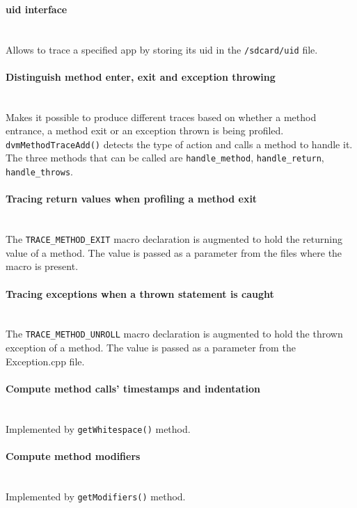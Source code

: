 \paragraph{} ~\\


\paragraph{uid interface} ~\\
Allows to trace a specified app by storing its uid in the
\texttt{/sdcard/uid} file.

\paragraph{Distinguish method enter, exit and exception throwing} ~\\
Makes it possible to produce different traces based on whether a
method entrance, a method exit or an exception thrown is being
profiled. \texttt{dvmMethodTraceAdd()} detects the type of action and calls a
method to handle it. The three methods that can be called are
\texttt{handle\_method}, \texttt{handle\_return}, \texttt{handle\_throws}.

\paragraph{Tracing return values when profiling a method exit} ~\\
The \texttt{TRACE\_METHOD\_EXIT} macro declaration is augmented to hold the
returning value of a method. The value is passed as a parameter from
the files where the macro is present.

\paragraph{Tracing exceptions when a thrown statement is caught} ~\\
The \texttt{TRACE\_METHOD\_UNROLL} macro declaration is augmented to hold the
thrown exception of a method. The value is passed as a parameter from
the Exception.cpp file.

\paragraph{Compute method calls' timestamps and indentation} ~\\
Implemented by \texttt{getWhitespace()} method.

\paragraph{Compute method modifiers} ~\\
Implemented by \texttt{getModifiers()} method.

